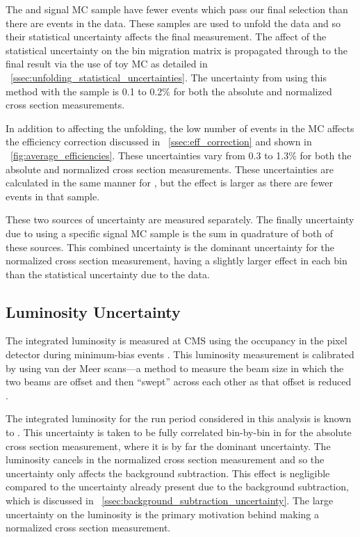 The \MADGRAPH and \POWHEG signal MC sample have fewer events which pass our
final selection than there are events in the data. These samples are used to
unfold the data and so their statistical uncertainty affects the final
measurement. The affect of the statistical uncertainty on the bin migration
matrix is propagated through to the final result via the use of toy MC as
detailed in \SEC~\ref{ssec:unfolding_statistical_uncertainties}. The
uncertainty from using this method with the \MADGRAPH sample is 0.1 to 0.2\%
for both the absolute and normalized cross section measurements.

In addition to affecting the unfolding, the low number of events in the MC
affects the efficiency correction discussed in \SEC~\ref{ssec:eff_correction}
and shown in \FIG~\ref{fig:average_efficiencies}. These uncertainties vary from
0.3 to 1.3\% for both the absolute and normalized cross section measurements.
These uncertainties are calculated in the same manner for \POWHEG, but the
effect is larger as there are fewer events in that sample.

These two sources of uncertainty are measured separately. The finally
uncertainty due to using a specific signal MC sample is the sum in quadrature
of both of these sources. This combined uncertainty is the dominant uncertainty
for the normalized cross section measurement, having a slightly larger effect
in each \phistar bin than the statistical uncertainty due to the data.

\subsection{Luminosity Uncertainty}
\label{ssec:lumi_uncertainty}

The integrated luminosity is measured at CMS using the occupancy in the pixel
detector during minimum-bias events \cite{cms_lumi_2013}. This luminosity
measurement is calibrated by using van der Meer scans---a method to measure the
beam size in which the two beams are offset and then ``swept'' across each
other as that offset is reduced \cite{vandermeer_1968}.

The integrated luminosity for the run period considered in this analysis is
known to \LumiUncertainty. This uncertainty is taken to be fully correlated
bin-by-bin in \phistar for the absolute cross section measurement, where it is
by far the dominant uncertainty. The luminosity cancels in the normalized
cross section measurement and so the uncertainty only affects the background
subtraction. This effect is negligible compared to the uncertainty already
present due to the background subtraction, which is discussed in
\SEC~\ref{ssec:background_subtraction_uncertainty}. The large uncertainty on
the luminosity is the primary motivation behind making a normalized cross
section measurement.

